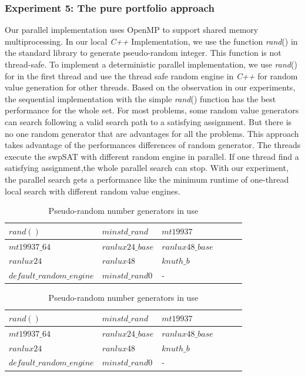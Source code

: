 \documentclass[12pt,a4paper,twoside]{scrartcl}
\numberwithin{equation}{section}
\begin{document}
  \subsubsection{Experiment 5: The pure portfolio approach} 
  \label{sec:Experiment 5}
Our parallel implementation uses OpenMP to support shared memory multiprocessing. In our local \emph{C++} Implementation, we use the function \emph{rand}() in the standard library to generate pseudo-random integer. This function is not thread-safe. To implement a deterministic parallel implementation, we use \emph{rand}()  for in the first thread and use the thread safe random engine in \emph{C++} for random value generation for other threads. Based on the observation in our experiments, the sequential implementation with the simple \emph{rand}() function has the best performance for the whole set. For most problems, some random value generators can search following a valid search path to a satisfying assignment. But there is no one random generator that are advantages for all the problems. This approach takes advantage of the performances differences of random generator. The threads execute the swpSAT with different random engine in parallel. If one thread find a satisfying assignment,the whole parallel search can stop. With our experiment, the parallel search gets a performance like the minimum runtime of one-thread local search with different random value engines. \\
\begin{table}[h!]
\begin{center}
    \begin{tabular}{|l|l|l|l|l|p{1cm}|}
\hline 
$rand()$&$minstd\_rand$&$mt19937$\\ \hline
$mt19937\_64$&$ranlux24\_base$&$ranlux48\_base$\\ \hline
$ranlux24$&$ranlux48$&$knuth\_b$\\ \hline
$default\_random\_engine$&$minstd\_rand0$&-\\ \hline
\end{tabular}
\end{center}
\caption{Pseudo-random number generators in use}
\end{table} 
\begin{table}[h!]
\begin{center}
    \begin{tabular}{|l|l|l|l|l|p{1cm}|}
\hline 
$rand()$&$minstd\_rand$&$mt19937$\\ \hline
$mt19937\_64$&$ranlux24\_base$&$ranlux48\_base$\\ \hline
$ranlux24$&$ranlux48$&$knuth\_b$\\ \hline
$default\_random\_engine$&$minstd\_rand0$&-\\ \hline
\end{tabular}
\end{center}
\caption{Pseudo-random number generators in use}
\end{table} 
\end{document}
